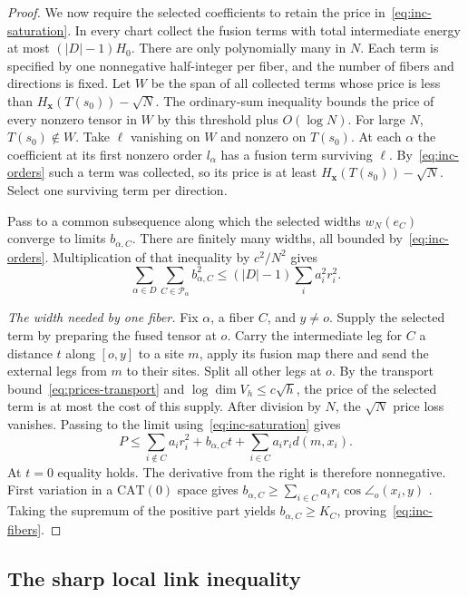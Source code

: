 \begin{proof}
We now require the selected coefficients to retain the price
in~\eqref{eq:inc-saturation}. In every chart collect the fusion terms
with total intermediate energy at most $(|D|-1)H_0$. There are only
polynomially many in $N$. Each term is specified by one nonnegative
half-integer per fiber, and the number of fibers and directions is
fixed. Let $W$ be the span of all collected terms whose price is
less than $H_{\mathbf x}(T(s_0))-\sqrt N$. The ordinary-sum inequality
bounds the price of every nonzero tensor in $W$ by this threshold
plus $O(\log N)$. For large $N$, $T(s_0)\notin W$. Take $\ell$
vanishing on $W$ and nonzero on $T(s_0)$. At each $\alpha$ the
coefficient at its first nonzero order $l_\alpha$ has a fusion term
surviving $\ell$. By~\eqref{eq:inc-orders} such a term was collected,
so its price is at least $H_{\mathbf x}(T(s_0))-\sqrt N$. Select one
surviving term per direction.

Pass to a common subsequence along which the selected widths
$w_N(e_C)$ converge to limits $b_{\alpha,C}$. There are finitely
many widths, all bounded by~\eqref{eq:inc-orders}. Multiplication
of that inequality by $c^2/N^2$ gives
\[
 \sum_{\alpha\in D}\sum_{C\in\mathcal P_\alpha}b_{\alpha,C}^2
                  \le (|D|-1)\sum_i a_i^2 r_i^2 .
\]

\emph{The width needed by one fiber.}
Fix $\alpha$, a fiber $C$, and $y\ne o$. Supply the selected term
by preparing the fused tensor at $o$. Carry the intermediate leg
for $C$ a distance $t$ along $[o,y]$ to a site $m$, apply its fusion
map there and send the external legs from $m$ to their sites. Split
all other legs at $o$. By the transport bound~\eqref{eq:prices-transport}
and $\log\dim V_h\le c\sqrt h$, the price of the selected term is at
most the cost of this supply. After division by $N$, the $\sqrt N$
price loss vanishes. Passing to the limit using~\eqref{eq:inc-saturation} gives
\[
 P\le\sum_{i\notin C}a_i r_i^2+b_{\alpha,C}t+
                       \sum_{i\in C}a_i r_i d(m,x_i).
\]
At $t=0$ equality holds. The derivative from the right is therefore
nonnegative. First variation in a $\mathrm{CAT}(0)$ space gives
$b_{\alpha,C}\ge\sum_{i\in C}a_i r_i\cos\angle_o(x_i,y)$
\cite[Chapter~II.3]{BridsonHaefliger}. Taking the supremum of the
positive part yields $b_{\alpha,C}\ge K_C$, proving~\eqref{eq:inc-fibers}.
\end{proof}

\subsection{The sharp local link inequality}

